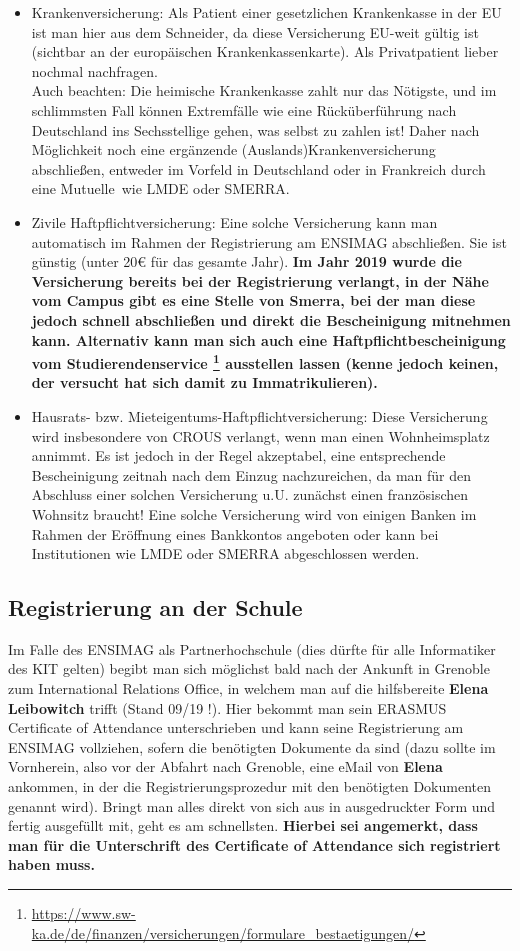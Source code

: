 \documentclass[11pt,a4paper]{article}
\newcommand{\change}[1]{{\bf #1}}
\begin{document}
	\begin{itemize}
		\item Krankenversicherung: Als Patient einer gesetzlichen Krankenkasse in der EU ist man hier aus dem Schneider, da diese Versicherung EU-weit gültig ist (sichtbar an der europäischen Krankenkassenkarte). Als Privatpatient lieber nochmal nachfragen.\\
		Auch beachten: Die heimische Krankenkasse zahlt nur das Nötigste, und im schlimmsten Fall können Extremfälle wie eine Rücküberführung nach Deutschland ins Sechsstellige gehen, was selbst zu zahlen ist! Daher nach Möglichkeit noch eine ergänzende (Auslands)Krankenversicherung abschließen, entweder im Vorfeld in Deutschland oder in Frankreich durch eine \glqq Mutuelle\grqq\ wie LMDE oder SMERRA.
  \item Zivile Haftpflichtversicherung: Eine solche Versicherung kann man automatisch im Rahmen der Registrierung am ENSIMAG abschließen. Sie ist günstig (unter 20€ für das gesamte Jahr). \change{Im Jahr 2019 wurde die Versicherung bereits bei der Registrierung verlangt, in der Nähe vom Campus gibt es eine Stelle von Smerra, bei der man diese jedoch schnell abschließen und direkt die Bescheinigung mitnehmen kann. Alternativ kann man sich auch eine Haftpflichtbescheinigung vom Studierendenservice \footnote{\url{https://www.sw-ka.de/de/finanzen/versicherungen/formulare_bestaetigungen/}} ausstellen lassen (kenne jedoch keinen, der versucht hat sich damit zu Immatrikulieren).}
		\item Hausrats- bzw. Mieteigentums-Haftpflichtversicherung: Diese Versicherung wird insbesondere von CROUS verlangt, wenn man einen Wohnheimsplatz annimmt. Es ist jedoch in der Regel akzeptabel, eine entsprechende Bescheinigung zeitnah nach dem Einzug nachzureichen, da man für den Abschluss einer solchen Versicherung u.U. zunächst einen französischen Wohnsitz braucht! Eine solche Versicherung wird von einigen Banken im Rahmen der Eröffnung eines Bankkontos angeboten oder kann bei Institutionen wie LMDE oder SMERRA abgeschlossen werden.
	\end{itemize}
	
	\subsection{Registrierung an der Schule}
	
  Im Falle des ENSIMAG als Partnerhochschule (dies dürfte für alle Informatiker des KIT gelten) begibt man sich möglichst bald nach der Ankunft in Grenoble zum International Relations Office, in welchem man auf die hilfsbereite \change{Elena Leibowitch} trifft (Stand 09/19 !). Hier bekommt man sein ERASMUS Certificate of Attendance unterschrieben und kann seine Registrierung am ENSIMAG vollziehen, sofern die benötigten Dokumente da sind (dazu sollte im Vornherein, also vor der Abfahrt nach Grenoble, eine eMail von \change{Elena} ankommen, in der die Registrierungsprozedur mit den benötigten Dokumenten genannt wird). Bringt man alles direkt von sich aus in ausgedruckter Form und fertig ausgefüllt mit, geht es am schnellsten. \change{Hierbei sei angemerkt, dass man für die Unterschrift des Certificate of Attendance sich registriert haben muss.}
	
\end{document}
